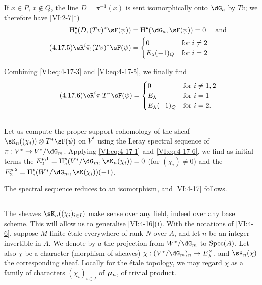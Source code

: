 If $x\in P$, $x\notin Q$, the line $D=\pi^{-1}(x)$ is sent
isomorphically onto $\dG_a$ by $T v$; we therefore have
\ref{VI:2-7}*) 
\begin{align} \notag 
  \h_c^\bullet(D,(T v)^\ast \sF(\psi)) &= \h^\bullet(\dG_a,\sF(\psi)) = 0 && \text{and} \\
  \tag{4.17.5}\label{VI:eq:4-17-5}
  \eR^i \bar\pi_! (T v)^\ast \sF(\psi) 
    &= \begin{cases} 
         0 & \text{for $i\ne 2$} \\
         E_\lambda(-1)_Q & \text{for $i=2$} 
       \end{cases} 
\end{align}

Combining \eqref{VI:eq:4-17-3} and \eqref{VI:eq:4-17-5}, we finally find 
\begin{equation*}\tag{4.17.6}\label{VI:eq:4-17-6}
  \eR^i \pi_! T^\ast\sF(\psi) = 
    \begin{cases}
      0 & \text{for $i\ne 1,2$} \\
      E_\lambda & \text{for $i=1$} \\
      E_\lambda(-1)_Q & \text{for $i=2$.} 
    \end{cases}
\end{equation*}





\subsection{}\label{VI:4-18}

Let us compute the proper-support cohomology of the sheaf
$\sK_n((\chi_i))\otimes T^\ast \sF(\psi)$ on $V^\ast$ using the
Leray spectral sequence of $\pi:V^\ast\to V^\ast/\dG_m$. Applying
\eqref{VI:eq:4-17-1} and \eqref{VI:eq:4-17-6}, we find as initial terms
the $E_2^{p,1} = \h_c^p(V^\ast/\dG_m,\sK_n(\chi_i)) = 0$ (for $(\chi_i)\ne 0$)
and the $E_2^{p,2} = \h_c^p(W^\ast/\dG_m,\sK(\chi_i))(-1)$.

The spectral sequence reduces to an isomorphism, and \ref{VI:4-17}
follows. 





\subsection{}\label{VI:4-19}

The sheaves $\sK_n((\chi_i)_{i\in I})$ make sense over any field,
indeed over any base scheme. This will allow us to generalise
\ref{VI:4-16}(i). With the notations of \ref{VI:4-6}, suppose $M$ finite
étale everywhere of rank $N$ over $A$, and let $n$ be an integer invertible in $A$.
We denote by $a$ the projection from $W^\ast/\dG_m$ to $\operatorname{Spec}(A)$. Let also $\chi$
be a character (morphism of sheaves)
$\chi:(V^\ast/\dG_m)_n \to E_\lambda^\times$, and $\sK_n(\chi)$ the corresponding
sheaf. Locally for the étale topology, we may regard $\chi$
as a family of characters $(\chi_i)_{i\in I}$ of ${\bm\mu}_n$, of trivial product.





